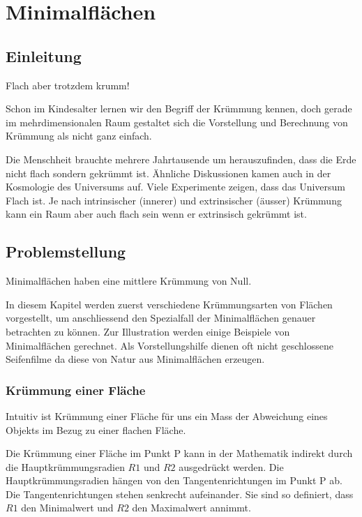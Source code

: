 \chapter{Minimalflächen\label{chapter:thema}}
\begin{refsection}


\section{Einleitung}

Flach aber trotzdem krumm!

Schon im Kindesalter lernen wir den Begriff der Krümmung kennen, doch gerade im mehrdimensionalen Raum gestaltet sich die Vorstellung und Berechnung von Krümmung als nicht ganz einfach. 

Die Menschheit brauchte mehrere Jahrtausende um herauszufinden, dass die Erde nicht flach sondern gekrümmt ist. 
Ähnliche Diskussionen kamen auch in der Kosmologie des Universums auf.
Viele Experimente zeigen, dass das Universum Flach ist. 
Je nach intrinsischer (innerer) und extrinsischer (äusser) Krümmung kann ein Raum aber auch flach sein wenn er extrinsisch gekrümmt ist.


\section{Problemstellung}

Minimalflächen haben eine mittlere Krümmung von Null. 

In diesem Kapitel werden zuerst verschiedene Krümmungsarten von Flächen vorgestellt, um anschliessend den Spezialfall der Minimalflächen genauer betrachten zu können. 
Zur Illustration werden einige Beispiele von Minimalflächen gerechnet. 
Als Vorstellungshilfe dienen oft nicht geschlossene Seifenfilme da diese von Natur aus  Minimalflächen erzeugen.


\subsection{Krümmung einer Fläche}

Intuitiv ist Krümmung einer Fläche für uns ein Mass der Abweichung eines Objekts im Bezug zu einer flachen Fläche. 

Die Krümmung einer Fläche im Punkt P kann in der Mathematik indirekt durch die Hauptkrümmungsradien $R1$ und $R2$ ausgedrückt werden. 
Die Hauptkrümmungsradien hängen von den Tangentenrichtungen im Punkt P ab. 
Die Tangentenrichtungen stehen senkrecht aufeinander.
Sie sind so definiert, dass $R1$ den Minimalwert und $R2$ den Maximalwert annimmt.


\end{refsection}
